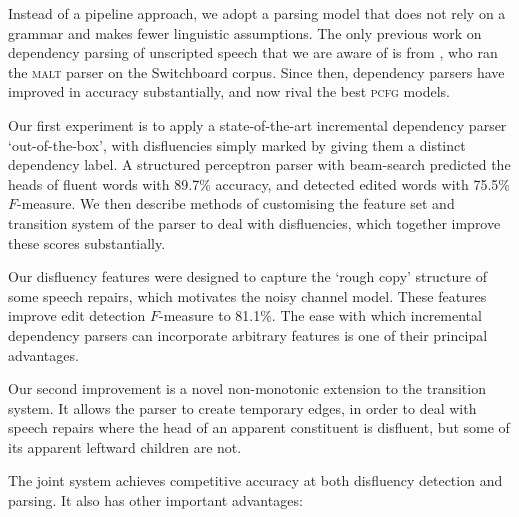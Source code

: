 \documentclass[11pt,letterpaper]{article}
\newcommand{\pcfg}{\textsc{pcfg}\xspace}
\begin{document}
Instead of a pipeline approach, we adopt a parsing model that does not rely on
a grammar and makes fewer linguistic assumptions.
The only previous work on dependency parsing of unscripted speech that we are aware
of is from \citet{jorgensen:07}, who ran the \textsc{malt} parser on the Switchboard
corpus. Since then, dependency parsers have improved in accuracy substantially,
and now rival the best \pcfg models.

Our first experiment is to apply a state-of-the-art incremental dependency parser
`out-of-the-box', with disfluencies simply marked by giving them a distinct
dependency label. A structured perceptron parser with beam-search
\citep{zhang:cl11,zhang:11} predicted the heads of fluent words
with 89.7\% accuracy, and detected edited words with 75.5\% $F$-measure.
We then describe methods of customising the feature set and transition system
of the parser to deal with disfluencies, which together improve these scores
substantially.

Our disfluency features were designed to capture the
`rough copy' structure of some speech repairs, which motivates the
\citet{Johnson04a} noisy channel model.  These features improve edit detection
$F$-measure to 81.1\%.  The ease with which incremental dependency parsers can
incorporate arbitrary features is one of their principal advantages.

Our second improvement is a novel non-monotonic extension to the transition
system. It allows the parser to create temporary edges, in order to deal with
speech repairs where the head of an apparent constituent is disfluent, but some
of its apparent leftward children are not.

The joint system achieves competitive accuracy at both disfluency detection and
parsing. It also has other important advantages:
\end{document}
